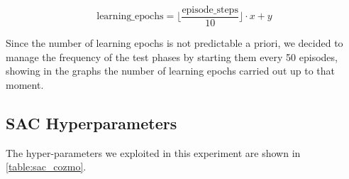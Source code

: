 \begin{equation}
	\label{eq:learning-step}
	\text{learning\_epochs} = \bigg\lfloor\frac{\text{episode\_steps}}{10}\bigg\rfloor \cdot x + y
\end{equation}

Since the number of learning epochs is not predictable a priori, we decided to manage the frequency of the test phases by starting them every 50 episodes, showing in the graphs the number of learning epochs carried out up to that moment.



\subsection{SAC Hyperparameters}

The hyper-parameters we exploited in this experiment are shown in \vref{table:sac_cozmo}.

